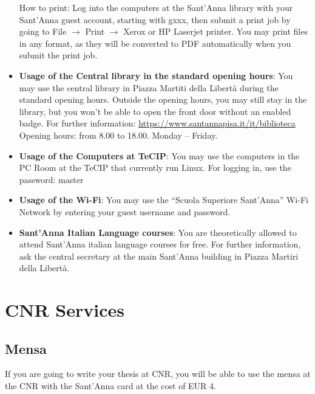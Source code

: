 \documentclass[11pt,fleqn,oneside]{book} %
\begin{document}
\begin{itemize}
How to print: Log into the computers at the Sant’Anna library with your Sant’Anna guest account, starting with gxxx, then submit a print job by going to File $\rightarrow$ Print $\rightarrow$ Xerox or HP Laserjet printer. You may print files in any format, as they will be converted to PDF automatically when you submit the print job. 
\item \textbf{Usage of the Central library in the standard opening hours}: You may use the central library in Piazza Martiti della Libertà during the standard opening hours. Outside the opening hours, you may still stay in the library, but you won’t be able to open the front door without an enabled badge. For further information: \url{https://www.santannapisa.it/it/biblioteca}
Opening hours:  from 8.00 to 18.00. Monday – Friday. 
\item \textbf{Usage of the Computers at TeCIP}: You may use the computers in the PC Room at the TeCIP that currently run Linux. For logging in, use the password: master
\item \textbf{Usage of the Wi-Fi}: You may use the “Scuola Superiore Sant’Anna” Wi-Fi Network by entering your guest username and password.
\item \textbf{Sant’Anna Italian Language courses}: You are theoretically allowed to attend Sant’Anna italian language courses for free. For further information, ask the central secretary at the main Sant’Anna building in Piazza Martiri della Libertà. 
\end{itemize}



\chapter{CNR Services}


\section{Mensa}

If you are going to write your thesis at CNR, you will be able to use the mensa at the CNR with the Sant’Anna card at the cost of EUR 4. 
\end{document}
